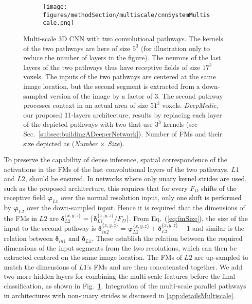 \documentclass[preprint,authoryear,12pt]{elsarticle}
\begin{document}
\begin{figure}[!h]
\centering
\begin{subfigure}[b]{1.0\textwidth}
\centering
	\texttt{[image: figures/methodSection/multiscale/cnnSystemMultiscale.png]}
\end{subfigure}
\caption{Multi-scale 3D CNN with two convolutional pathways. The kernels of the two pathways are here of size $5^3$ (for illustration only to reduce the number of layers in the figure). The neurons of the last layers of the two pathways thus have receptive fields of size $17^3$ voxels. The inputs of the two pathways are centered at the same image location, but the second segment is extracted from a down-sampled version of the image by a factor of 3. The second pathway processes context in an actual area of size $51^3$ voxels. \textit{DeepMedic}, our proposed 11-layers architecture, results by replacing each layer of the depicted pathways with two that use $3^3$ kernels (see Sec.~\ref{subsec:buildingADeeperNetwork}). Number of FMs and their size depicted as (\textit{Number $\times$ Size}).}
\label{fig:cnnMultiscale}
\end{figure}
%
 
To preserve the capability of dense inference, spatial correspondence of the activations in the FMs of the last convolutional layers of the two pathways, $L1$ and $L2$, should be ensured. In networks  where only unary kernel strides are used, such as the proposed architecture, this requires that for every $F_D$ shifts of the receptive field $\boldsymbol{\varphi}_{L1}$ over the normal resolution input, only one shift is performed by $\boldsymbol{\varphi}_{L2}$ over the down-sampled input. Hence it is required that the dimensions of the FMs in $L2$ are $\boldsymbol{\delta}_{L2}^{\{ x,y,z\}} = \lceil \boldsymbol{\delta}_{L1}^{\{ x,y,z\}} / F_D \rceil$. From Eq.~(\ref{eq:fmSize}), the size of the input to the second pathway is $\boldsymbol{\delta}_{in2}^{\{ x,y,z\}} = \boldsymbol{\varphi}_{L2}^{\{ x,y,z\}} + \boldsymbol{\delta}_{L2}^{\{ x,y,z\}} -1 $ and similar is the relation between $\boldsymbol{\delta}_{in1}$ and $\boldsymbol{\delta}_{L1}$. These establish the relation between the required dimensions of the input segments from the two resolutions, which can then be extracted centered on the same image location. The FMs of $L2$ are up-sampled to match the dimensions of $L1$'s FMs and are then concatenated together. We add two more hidden layers for combining the multi-scale features before the final classification, as shown in Fig.~\ref{fig:cnnMultiscale}. Integration of the multi-scale parallel pathways in architectures with non-unary strides is discussed in \ref{app:detailsMultiscale}.
\end{document}

